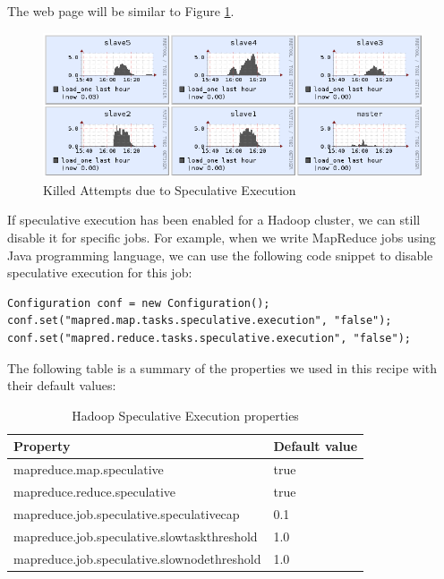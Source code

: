 The web page will be similar to Figure \ref{fig:killed.jobs.speculative}.
\begin{figure}[ht]
  \centering
  \includegraphics[width=.8\textwidth]{figs/5163os_06_10.png}
  \caption{Killed Attempts due to Speculative Execution}\label{fig:killed.jobs.speculative}
\end{figure} 
If speculative execution has been enabled for a Hadoop cluster, we can still disable it for specific jobs. For example, when we write MapReduce jobs using Java programming language, we can use the following code snippet to disable speculative execution for this job:
\lstset{style=bashstyle}
\begin{lstlisting}
Configuration conf = new Configuration();
conf.set("mapred.map.tasks.speculative.execution", "false");
conf.set("mapred.reduce.tasks.speculative.execution", "false");
\end{lstlisting}

The following table is a summary of the properties we used in this recipe with their default values:
\begin{table}[ht]
  \centering
  \begin{tabular}{ll}
    \toprule
    \textbf{Property} & \textbf{Default value} \\ \midrule
      mapreduce.map.speculative & true \\
      mapreduce.reduce.speculative & true \\
      mapreduce.job.speculative.speculativecap & 0.1 \\
      mapreduce.job.speculative.slowtaskthreshold & 1.0 \\
      mapreduce.job.speculative.slownodethreshold & 1.0 \\ \bottomrule
  \end{tabular}
  \caption{Hadoop Speculative Execution properties}\label{tbl:speculative}
\end{table}

